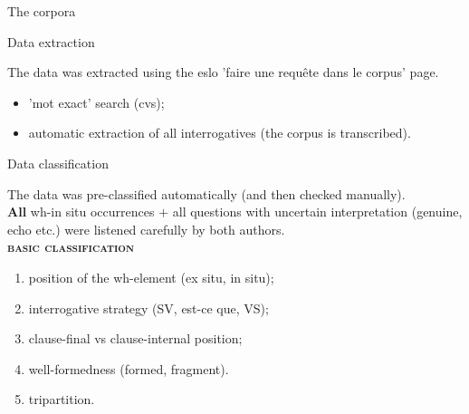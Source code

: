 \documentclass[lesson_slides]{subfiles}
\begin{document}
\begin{frame}[c]{The corpora}
    
\end{frame}
\begin{frame}[c]{Data extraction}

    \noindent The data was extracted using the eslo 'faire une requête dans le corpus' page. \pause

    \begin{itemize}
        \item[\ding{227}] 'mot exact' search (cvs); \pause
        \item[\ding{227}] automatic extraction of all interrogatives (the corpus is transcribed).
    \end{itemize}
    
\end{frame}
\begin{frame}[c]{Data classification}

    \noindent The data was pre-classified automatically (and then checked manually).\\ \pause
    \noindent \textbf{All} wh-in situ occurrences $+$ all questions with uncertain interpretation (genuine, echo etc.) were listened carefully by both authors.\\
    
    \textbf{\textsc{basic classification}} \pause
    \begin{enumerate}
        \item position of the wh-element \pause (ex situ, in situ); \pause
        \item interrogative strategy \pause (SV, est-ce que, VS); \pause
        \item clause-final vs clause-internal position; \pause
        \item well-formedness \pause (formed, fragment).
        \item tripartition.
    \end{enumerate}
    
\end{frame}
\end{document}
